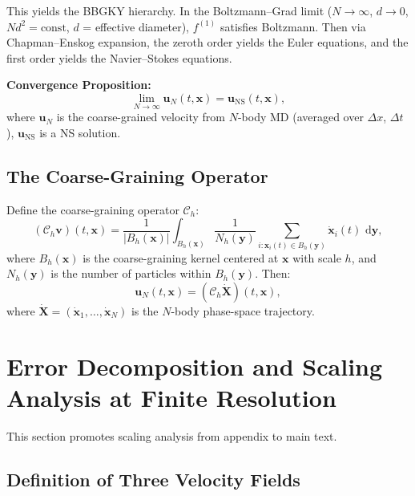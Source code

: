 \documentclass[11pt,a4paper]{article}
\theoremstyle{definition}
\theoremstyle{remark}
\newcommand{\abs}[1]{\left\lvert#1\right\rvert}
\newcommand{\dd}{\,\mathrm{d}}
\newcommand{\uN}{\bm{u}_N}
\newcommand{\uNS}{\bm{u}_{\text{NS}}}
\begin{document}
This yields the BBGKY hierarchy. In the Boltzmann--Grad limit ($N\to\infty$, $d\to 0$, $Nd^2 = \text{const}$, $d$ = effective diameter), $f^{(1)}$ satisfies Boltzmann. Then via Chapman--Enskog expansion, the zeroth order yields the Euler equations, and the first order yields the Navier--Stokes equations.

\textbf{Convergence Proposition:}
\begin{equation}\label{eq:convergence}
  \lim_{N\to\infty} \uN(t,\bm{x}) = \uNS(t,\bm{x}),
\end{equation}
where $\uN$ is the coarse-grained velocity from $N$-body MD (averaged over $\Delta x$, $\Delta t$), $\uNS$ is a NS solution.

\subsection{The Coarse-Graining Operator}

Define the coarse-graining operator $\mathcal{C}_{h}$:
\begin{equation}\label{eq:coarse}
  (\mathcal{C}_{h}\bm{v})(t,\bm{x})
  = \frac{1}{\abs{B_h(\bm{x})}}
   \int_{B_h(\bm{x})}
   \frac{1}{N_h(\bm{y})}\sum_{i: \bm{x}_i(t)\in B_h(\bm{y})} \dot{\bm{x}}_i(t)
   \,\dd\bm{y},
\end{equation}
where $B_h(\bm{x})$ is the coarse-graining kernel centered at $\bm{x}$ with scale $h$, and $N_h(\bm{y})$ is the number of particles within $B_h(\bm{y})$.
Then:
\begin{equation}\label{eq:un_def}
  \uN(t,\bm{x}) = (\mathcal{C}_{h}\dot{\bm{X}})(t,\bm{x}),
\end{equation}
where $\dot{\bm{X}} = (\dot{\bm{x}}_1,\dots,\dot{\bm{x}}_N)$ is the $N$-body phase-space trajectory.

\section{Error Decomposition and Scaling Analysis at Finite Resolution}

This section promotes scaling analysis from appendix to main text.

\subsection{Definition of Three Velocity Fields}
\end{document}
